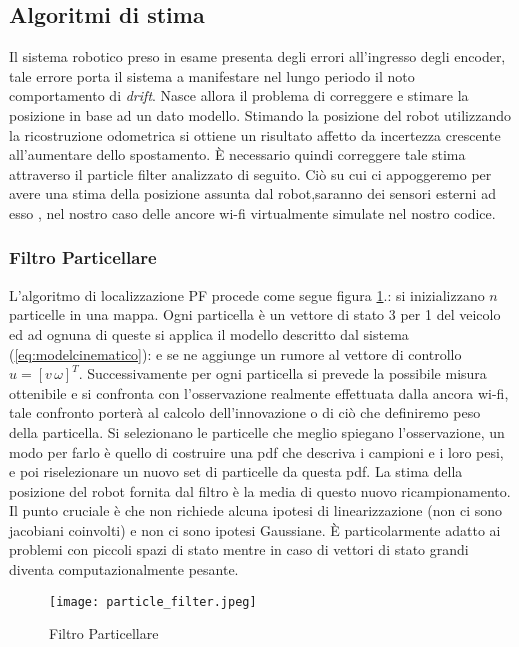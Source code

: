 \subsection{Algoritmi di stima}
Il sistema robotico preso in esame presenta degli errori all'ingresso degli 
encoder, tale errore porta il sistema a manifestare nel lungo periodo il noto 
comportamento di \emph{drift}. Nasce allora il problema di correggere e stimare
la posizione in base ad un dato modello.
Stimando la posizione del robot utilizzando la ricostruzione 
odometrica si ottiene un risultato affetto da incertezza crescente all'aumentare 
dello spostamento.
È necessario quindi correggere tale stima attraverso il particle filter\cite{newman2003} analizzato di seguito.
Ciò su cui ci appoggeremo per avere una stima della posizione assunta dal robot,saranno
dei sensori esterni ad esso , nel nostro caso delle ancore wi-fi virtualmente simulate nel
nostro codice.
%
\subsubsection{Filtro Particellare}
%
L'algoritmo di localizzazione PF procede come segue figura \ref{fig:particle filter}.: si inizializzano $n$ 
particelle in una mappa.
Ogni particella è un vettore di stato 3 per 1 del veicolo ed ad ognuna di queste 
si applica il modello descritto dal sistema (\ref{eq:modelcinematico}): e se ne aggiunge un rumore al vettore di
controllo $u = [v \, \omega]^{T}$. 
Successivamente per ogni particella si prevede la possibile misura ottenibile e si confronta 
con l'osservazione realmente effettuata dalla ancora wi-fi, tale confronto porterà al calcolo 
dell'innovazione o di ciò che definiremo peso della particella.
Si selezionano le particelle che meglio spiegano l'osservazione, un modo per 
farlo è quello di costruire una pdf che descriva i campioni e i loro pesi, e 
poi riselezionare un nuovo set di particelle da questa pdf.
La stima della posizione del robot fornita dal filtro è la media di questo 
nuovo ricampionamento. 
Il punto cruciale è che non richiede alcuna ipotesi di linearizzazione (non ci 
sono jacobiani coinvolti) e non ci sono ipotesi Gaussiane. È particolarmente 
adatto ai problemi con piccoli spazi di stato mentre in caso di vettori di 
stato grandi diventa computazionalmente pesante.

\begin{figure}[!htb]
  \texttt{[image: particle\_filter.jpeg]}
  \caption{Filtro Particellare}
  \label{fig:particle filter}
\end{figure}